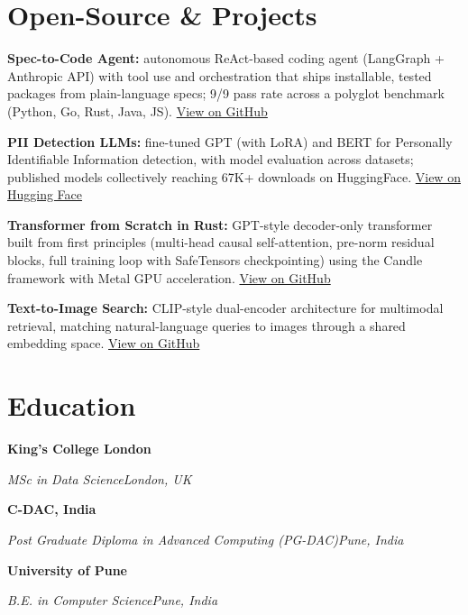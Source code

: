 \documentclass[10pt,a4paper]{article}
\newcommand{\entry}[4]{%
  {\color{company}\bfseries #1}\hfill {\color{muted}#2}\par
  \vspace{1pt}
  {\itshape #3}\hfill {\color{muted}\itshape #4}\par
  \vspace{3pt}%
}
\begin{document}
\section{Open-Source \& Projects}
\begin{tight}
  \item \textbf{Spec-to-Code Agent:} autonomous ReAct-based coding agent (LangGraph + Anthropic API) with tool use and orchestration that ships installable, tested packages from plain-language specs; 9/9 pass rate across a polyglot benchmark (Python, Go, Rust, Java, JS). \href{https://github.com/abhijeetscode/Spec-to-Code-Agent}{View on GitHub}
  \item \textbf{PII Detection LLMs:} fine-tuned GPT (with LoRA) and BERT for Personally Identifiable Information detection, with model evaluation across datasets; published models collectively reaching 67K+ downloads on HuggingFace. \href{https://huggingface.co/ab-ai/pii_model}{View on Hugging Face}
  \item \textbf{Transformer from Scratch in Rust:} GPT-style decoder-only transformer built from first principles (multi-head causal self-attention, pre-norm residual blocks, full training loop with SafeTensors checkpointing) using the Candle framework with Metal GPU acceleration. \href{https://github.com/abhijeetscode/transformer-rust}{View on GitHub}
  \item \textbf{Text-to-Image Search:} CLIP-style dual-encoder architecture for multimodal retrieval, matching natural-language queries to images through a shared embedding space. \href{https://github.com/abhijeetscode/text-to-image-search}{View on GitHub}
\end{tight}

\section{Education}
\entry{King's College London}{}{MSc in Data Science}{London, UK}
\vspace{-3pt}
\entry{C-DAC, India}{}{Post Graduate Diploma in Advanced Computing (PG-DAC)}{Pune, India}
\vspace{-3pt}
\entry{University of Pune}{}{B.E. in Computer Science}{Pune, India}
\end{document}
